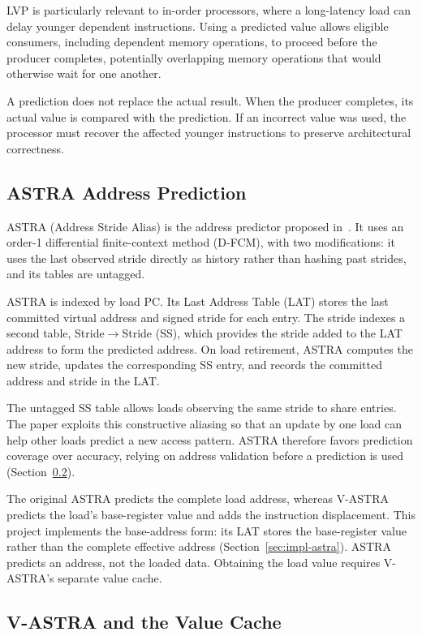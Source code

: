 LVP is particularly relevant to in-order processors, where a
long-latency load can delay younger dependent instructions. Using
a predicted value allows eligible consumers, including dependent
memory operations, to proceed before the producer completes,
potentially overlapping memory operations that would otherwise
wait for one another.

A prediction does not replace the actual result. When the producer
completes, its actual value is compared with the prediction. If an
incorrect value was used, the processor must recover the affected
younger instructions to preserve architectural correctness.

\subsection{ASTRA Address Prediction}

ASTRA (Address Stride Alias) is the address predictor proposed
in~\cite{ravenel2025architecting}. It uses an order-1 differential
finite-context method (D-FCM), with two modifications: it uses the
last observed stride directly as history rather than hashing past
strides, and its tables are untagged.

ASTRA is indexed by load PC. Its Last Address Table (LAT) stores
the last committed virtual address and signed stride for each
entry. The stride indexes a second table, Stride$\rightarrow$Stride
(SS), which provides the stride added to the LAT address to form
the predicted address. On load retirement, ASTRA computes the new
stride, updates the corresponding SS entry, and records the
committed address and stride in the LAT.

The untagged SS table allows loads observing the same stride to
share entries. The paper exploits this constructive aliasing so
that an update by one load can help other loads predict a new
access pattern. ASTRA therefore favors prediction coverage over
accuracy, relying on address validation before a prediction is
used (Section~\ref{sec:bg-vastra}).

The original ASTRA predicts the complete load address, whereas
V-ASTRA predicts the load's base-register value and adds the
instruction displacement. This project implements the
base-address form: its LAT stores the base-register value rather
than the complete effective address
(Section~\ref{sec:impl-astra}). ASTRA predicts an address, not
the loaded data. Obtaining the load value requires V-ASTRA's
separate value cache.

\subsection{V-ASTRA and the Value Cache}
\label{sec:bg-vastra}

